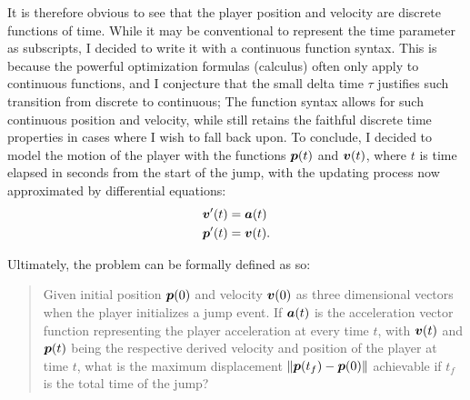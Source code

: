 It is therefore obvious to see that the player position and velocity are discrete functions of time. While it may be conventional to represent the time parameter as subscripts, I decided to write it with a continuous function syntax. This is because the powerful optimization formulas (calculus) often only apply to continuous functions, and I conjecture that the small delta time $\tau$ justifies such transition from discrete to continuous; The function syntax allows for such continuous position and velocity, while still retains the faithful discrete time properties in cases where I wish to fall back upon. To conclude, I decided to model the motion of the player with the functions $\boldsymbol{p}(t)$ and $\boldsymbol{v}(t)$, where $t$ is time elapsed in seconds from the start of the jump, with the updating process now approximated by differential equations:
\begin{align}
    \boldsymbol{v}'(t) &= \boldsymbol{a}(t)\\
    \boldsymbol{p}'(t) &= \boldsymbol{v}(t).
\end{align}

Ultimately, the problem can be formally defined as so:
\begin{quote}
    Given initial position $\boldsymbol{p}(0)$ and velocity $\boldsymbol{v}(0)$ as three dimensional vectors when the player initializes a jump event. If $\boldsymbol{a}(t)$ is the acceleration vector function representing the player acceleration at every time $t$, with $\boldsymbol{v}(t)$ and $\boldsymbol{p}(t)$ being the respective derived velocity and position of the player at time $t$, what is the maximum displacement $\|\boldsymbol{p}(t_f) - \boldsymbol{p}(0)\|$ achievable if $t_f$ is the total time of the jump?
\end{quote}


